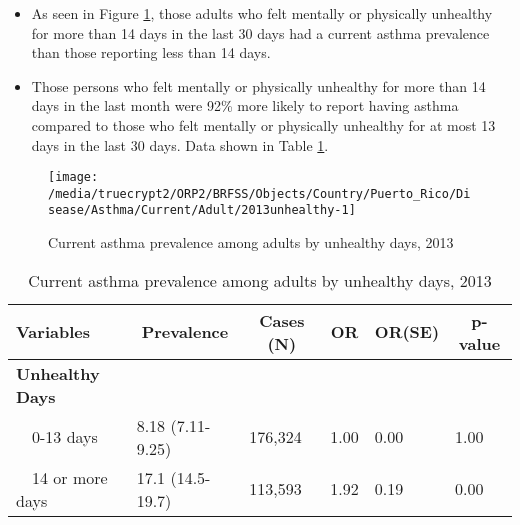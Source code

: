 \newpage
\begin{itemize}

\item As seen in Figure \ref{fig:unhlthy.Asthma.2013}, those adults who felt mentally or physically unhealthy for more than 14 days in the last 30 days had a  
current asthma prevalence than those reporting less than 14 days.


\item Those persons who felt mentally or physically unhealthy for more than 14 days in the last month were 92\% more likely to report having asthma compared to those who felt mentally or physically unhealthy for at most 13 days in the last 30 days. Data shown in Table \ref{tab:unhlthy.Asthma.2013}.

\end{itemize}

\begin{figure}[H]
\caption{Current asthma prevalence among adults by unhealthy days, 2013}
\label{fig:unhlthy.Asthma.2013}

\begin{knitrout}
\color{fgcolor}

{\centering \texttt{[image: /media/truecrypt2/ORP2/BRFSS/Objects/Country/Puerto\_Rico/Disease/Asthma/Current/Adult/2013unhealthy-1]} 

}



\end{knitrout}
\end{figure}

\begin{table}[H]
\caption{Current asthma prevalence among adults by unhealthy days, 2013\label{tab:unhlthy.Asthma.2013}} 
\begin{center}
\begin{tabular}{llllll}
\hline\hline
\multicolumn{1}{l}{Variables}&\multicolumn{1}{c}{Prevalence}&\multicolumn{1}{c}{Cases (N)}&\multicolumn{1}{c}{OR}&\multicolumn{1}{c}{OR(SE)}&\multicolumn{1}{c}{p-value}\tabularnewline
\hline
{\bfseries Unhealthy Days}&&&&&\tabularnewline
~~0-13 days&8.18 (7.11-9.25)&176,324&1.00&0.00&1.00\tabularnewline
~~14 or more days&17.1 (14.5-19.7)&113,593&1.92&0.19&0.00\tabularnewline
\hline
\end{tabular}\end{center}

\end{table}


